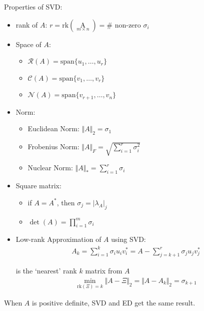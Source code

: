 \begin{point}
    Properties of SVD:
\end{point}

   
\begin{itemize}[topsep=2pt,itemsep=0pt]
    \item rank of $ A $: $ r=\mathrm{rk}(\mathop{A}\limits_{m\times n} )=\# \text{ non-zero } \sigma _i  $
    \item Space of $ A  $:
    \begin{itemize}
        \item $ \mathcal{R}(A)=\mathrm{span}\{u_1,\ldots ,u_r\}  $
        \item $ \mathcal{C}(A)=\mathrm{span}\{v_1,\ldots,v_r\}  $
        \item $ \mathcal{N}(A)=\mathrm{span}\{v_{r+1},\ldots,v_n\}  $
    \end{itemize}
    \item Norm:
    \begin{itemize}[topsep=2pt,itemsep=0pt]
        \item Euclidean Norm: $ \Vert A \Vert _2=\sigma _1 $
        \item Frobenius Norm: $ \Vert A \Vert _F=\sqrt{\sum_{i=1}^r\sigma _i^2 } $
        \item Nuclear Norm: $ \Vert A \Vert _*=\sum_{i=1}^r\sigma _i $
    \end{itemize}
    \item Square matrix:
    \begin{itemize}
        \item if $ A=A^* $, then $ \sigma _j=|\lambda _A|_j $
        \item $ \det(A)=\prod_{i=1}^m\sigma _i $
    \end{itemize}
    \item Low-rank Approximation of $ A $ using SVD:
    \begin{align}
        A_k= \sum_{i=1}^k\sigma _iu_iv_i^*=A-\sum_{j=k+1}^r\sigma _ju_jv_j^*
    \end{align}
    
    is the `nearest' rank $ k $ matrix from $ A $ 
    \begin{align}
        \mathop{\min}\limits_{\mathrm{rk}(\Xi)=k }\Vert A-\Xi \Vert _2=\Vert A-A_k \Vert _2=\sigma _{k+1}  
    \end{align}
    
\end{itemize}

\begin{point}
    When $ A $ is positive definite, SVD and ED get the same result.
\end{point}

